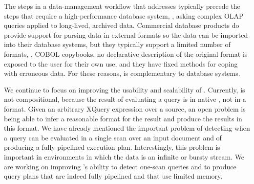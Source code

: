 
The steps in a data-management workflow that \padx{} addresses
typically precede the steps that require a high-performance database
system, \eg{}, asking complex OLAP queries applied to long-lived,
archived data.  Commercial database products do provide support for
parsing data in external formats so the data can be imported into
their database systems, but they typically support a limited number of
formats, \eg{}, COBOL copybooks, no declarative description of the
original format is exposed to the user for their own use, and they
have fixed methods for coping with erroneous data.  For these reasons,
\padx{} is complementary to database systems.




We continue to focus on improving the usability and scalability of
\padx{}.  Currently, \padx{} is not compositional, because the result
of evaluating a query is in native \Xml{}, not in a \pads{} format.
Given an arbitrary XQuery expression over a \padx{} source, an open
problem is being able to infer a reasonable \pads{} format for the
result and produce the results in this format.  We have already
mentioned the important problem of detecting when a query can be
evaluated in a single scan over an input document and of producing a
fully pipelined execution plan.  Interestingly, this problem is
important in \Xml{} environments in which the \Xml{} data is an
infinite or bursty stream.  We are working on improving \Galax{}'s
ability to detect one-scan queries and to produce query plans that are
indeed fully pipelined and that use limited memory.


